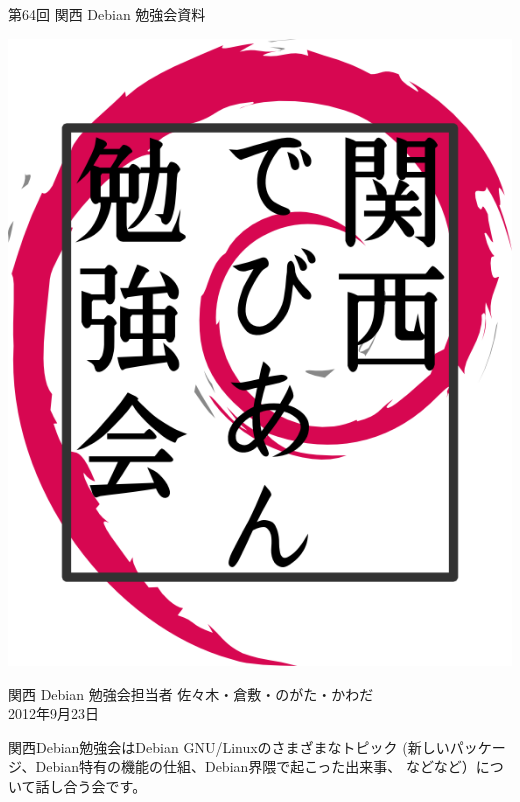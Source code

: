 \documentclass[mingoth,a4paper]{jsarticle}
\newcommand{\debmtgyear}{2012}
\newcommand{\debmtgdate}{23}
\newcommand{\debmtgmonth}{9}
\newcommand{\debmtgnumber}{64}
\begin{document}
\begin{titlepage}


 第\debmtgnumber{}回 関西 Debian 勉強会資料

\vspace{2cm}

\begin{center}
\includegraphics{image200802/kansaidebianlogo.png}
\end{center}

\begin{flushright}
\hfill{}関西 Debian 勉強会担当者 佐々木・倉敷・のがた・かわだ \\
\hfill{}\debmtgyear{}年\debmtgmonth{}月\debmtgdate{}日
\end{flushright}

\thispagestyle{empty}
\end{titlepage}


 関西Debian勉強会はDebian GNU/Linuxのさまざまなトピック
 (新しいパッケージ、Debian特有の機能の仕組、Debian界隈で起こった出来事、
 などなど）について話し合う会です。
\end{document}
